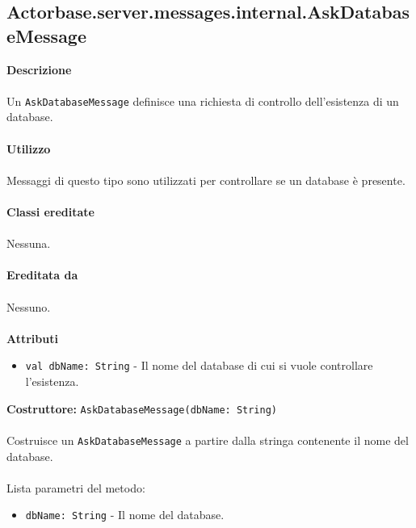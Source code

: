 \documentclass[a4paper]{article}
\begin{document}
	\subsection{Actorbase.server.messages.internal.AskDatabaseMessage}
		\textbf{Descrizione}
			\\ \\
			Un \texttt{AskDatabaseMessage} definisce una richiesta di controllo dell'esistenza di un database.
			\\ \\
		\textbf{Utilizzo}
			\\ \\
			Messaggi di questo tipo sono utilizzati per controllare se un database è presente.
			\\ \\
		\textbf{Classi ereditate}
			\\ \\
			Nessuna.
			\\ \\
		\textbf{Ereditata da}
			\\ \\
			Nessuno.
			\\ \\
		\textbf{Attributi}
			\begin{itemize}
				\item \texttt{val dbName: String} - Il nome del database di cui si vuole controllare l'esistenza.
			\end{itemize}
		\textbf{Costruttore:} \texttt{AskDatabaseMessage(dbName: String)}
		\\ \\
		Costruisce un \texttt{AskDatabaseMessage} a partire dalla stringa contenente il nome del database.
		\\ \\
		Lista parametri del metodo:
		\begin{itemize}
			\item \texttt{dbName: String} - Il nome del database.
		\end{itemize}
			
			
\end{document}
